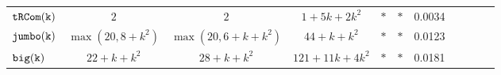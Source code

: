 {\begin {table}[t]
\begin{center}
{\begin{tabular}{ | >{\tiny}l | c | c | c | c | c | c | c | c | c  |c}
         $  \mathtt{tRCom(k)}$ &  $2$ &  $ 2$ & $ 1 + 5k + 2 k^2 $  &  $ * $   &   $* $  & 0.0034  \\ %
         $  \mathtt{{jumbo(k)}}$&  $ \max(20, 8+k^2)$  & $  \max(20, 6+k+k^2)$   &   $ {44+k+k^2} $  &  $ * $   &  $* $ & 0.0123 \\%
         $  {\mathtt{big(k)}} $&  $22+k+k^2$  &   $28 + k + k^2$ &  $121+11k+4k^2 $  &  $ * $   &  $* $  & 0.0181 \\ %
        \hline \hline 
        \end{tabular}
}
\end{center}
\vspace{-0.5cm}
\end{table}
}



